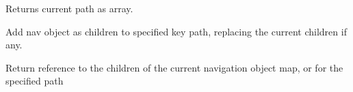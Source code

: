 \documentclass[letterpaper,10pt,english]{sphinxmanual}
\begin{document}
\begin{fulllineitems}
\begin{fulllineitems}
\label{knop_nav:knop_nav.actionpath}
Returns current path as array.

\end{fulllineitems}



\begin{fulllineitems}
\end{fulllineitems}


\begin{fulllineitems}
\label{knop_nav:knop_nav.addchildren}
\end{fulllineitems}


\begin{fulllineitems}
Add nav object as children to specified key path, replacing the current children if any.

\end{fulllineitems}


\begin{fulllineitems}
\label{knop_nav:knop_nav.children}
\end{fulllineitems}


\begin{fulllineitems}
Return reference to the children of the current navigation object map, or for the specified path

\end{fulllineitems}


\begin{fulllineitems}
\label{knop_nav:knop_nav.class}
\end{fulllineitems}




\end{fulllineitems}
\end{document}
